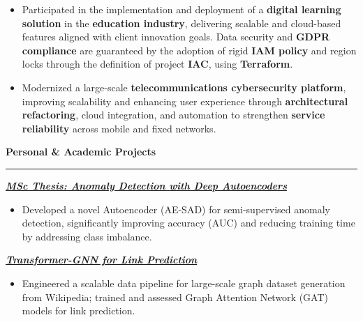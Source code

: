 \documentclass[9pt, a4paper]{article}
\newcommand{\cvsection}[1]{%
	\vspace{2pt}\par
	{\Large\bfseries\color{sectionblue}#1}\par
	\vspace{2pt}\hrule\vspace{6pt}
}
\newcommand{\cvproject}[1]{%
	\par {{\bfseries{\textit{#1}}}} \par \vspace{4pt}
}
\begin{document}
\begin{minipage}[t]{0.65\linewidth}
\begin{itemize}[leftmargin=*, nosep]
			\vspace{5pt}
			\item \footnotesize Participated in the implementation and deployment of a \textbf{digital learning solution} in the \textbf{education industry}, delivering scalable and cloud-based features aligned with client innovation goals. Data security and \textbf{GDPR compliance} are guaranteed by the adoption of rigid \textbf{IAM policy} and region locks through the definition of project \textbf{IAC}, using \textbf{Terraform}. 
			
			
			\vspace{5pt}
			\item \footnotesize Modernized a large-scale \textbf{telecommunications cybersecurity platform}, improving scalability and enhancing user experience through \textbf{architectural refactoring}, cloud integration, and automation to strengthen \textbf{service reliability} across mobile and fixed networks. 
		\end{itemize}
		
		\vspace{10pt}\par
		\cvsection{Personal \& Academic Projects}
		
		\cvproject{\href{https://github.com/bGuzzo/msc-ai-ml-thesis-anomaly-detection}{MSc Thesis: Anomaly Detection with Deep Autoencoders}}
		\begin{itemize}[leftmargin=*, nosep]
			\item \footnotesize Developed a novel Autoencoder (AE-SAD) for semi-supervised anomaly detection, significantly improving accuracy (AUC) and reducing training time by addressing class imbalance.
		\end{itemize}
		
		\vspace{5pt}
		\cvproject{\href{https://github.com/bGuzzo/transformer-gnn-link-prediction}{Transformer-GNN for Link Prediction}}
		\begin{itemize}[leftmargin=*, nosep]
			\item \footnotesize Engineered a scalable data pipeline for large-scale graph dataset generation from Wikipedia; trained and assessed Graph Attention Network (GAT) models for link prediction.
		\end{itemize}
		

\end{minipage}
\end{document}
